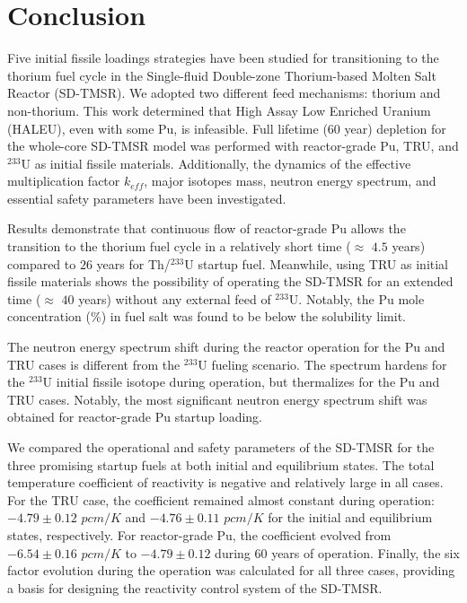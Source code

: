 \section{Conclusion} \label{Conclusion}
Five initial fissile loadings strategies have been studied for 
transitioning to the thorium fuel cycle in the Single-fluid Double-zone 
Thorium-based Molten Salt Reactor (SD-TMSR). We 
adopted two different feed mechanisms: thorium and non-thorium. 
This work determined that High Assay Low Enriched Uranium (HALEU), even with some Pu, is infeasible. 
Full lifetime (60 year) depletion for the whole-core SD-TMSR model was 
performed with reactor-grade Pu, TRU, and $^{233}$U as initial fissile 
materials. Additionally, the dynamics of the effective multiplication factor 
$k_{eff}$, major isotopes mass, neutron energy spectrum, and essential safety 
parameters have been investigated. 

Results demonstrate that continuous flow of reactor-grade Pu allows the 
transition to the thorium fuel cycle in a relatively short time ($\approx$ 
$4.5$ years) compared to $26$ years for Th/$^{233}$U startup fuel. 
Meanwhile, using \gls{TRU} as initial fissile materials shows the possibility 
of operating the SD-TMSR for an extended time ($\approx$ $40$ years) 
without any external feed of $^{233}$U. Notably, the Pu mole concentration (\%) in 
fuel salt was found to be below the solubility limit. 

The neutron energy spectrum shift during the reactor operation 
for the Pu and TRU cases is different from the $^{233}$U fueling scenario. 
The spectrum hardens for the $^{233}$U initial fissile isotope during 
operation, but thermalizes for the Pu and TRU cases. Notably, the most 
significant neutron energy spectrum shift was obtained for reactor-grade Pu 
startup loading. 

We compared the operational and safety parameters of the \gls{SD-TMSR} for the 
three promising startup fuels at both initial and equilibrium states. The total 
temperature coefficient of reactivity is negative and relatively large in all 
cases. For the TRU case, the coefficient remained almost constant during 
operation: $-4.79\pm0.12$ $pcm/K$ and $-4.76\pm0.11$ $pcm/K$ for the initial 
and equilibrium states, respectively. For reactor-grade Pu, the coefficient 
evolved from $-6.54\pm0.16$ $pcm/K$ to $-4.79\pm0.12$ during 
60 years of operation. Finally, the six factor evolution during the operation 
was calculated for all three cases, providing a basis for designing the reactivity control system of the \gls{SD-TMSR}.

